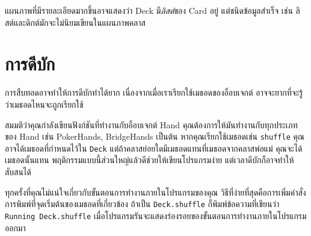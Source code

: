 แผนภาพที่มีรายละเอียดมากขึ้นอาจแสดงว่า Deck มี{\em ลิสต์}ของ Card อยู่ แต่ชนิดข้อมูลสำเร็จ 
เช่น ลิสต์และดิกต์มักจะไม่นิยมเขียนในแผนภาพคลาส

\section{การดีบัก}

การสืบทอดอาจทำให้การดีบักทำได้ยาก เนื่องจากเมื่อเราเรียกใช้เมธอดของอ็อบเจกต์ อาจจะยากที่จะรู้ว่าเมธอดไหนจะถูกเรียกใช้ 


สมมติว่าคุณกำลังเขียนฟังก์ชันที่ทำงานกับอ็อบเจกต์ Hand 
คุณต้องการให้มันทำงานกับทุกประเภทของ Hand 
เช่น PokerHands, BridgeHands เป็นต้น 
หากคุณเรียกใช้เมธอดเช่น {\tt shuffle} 
คุณอาจได้เมธอดที่กำหนดไว้ใน {\tt Deck} 
แต่ถ้าคลาสย่อยใดมีเมธอดแทนที่เมธอดจากคลาสพ่อแม่ คุณจะได้เมธอดนั้นแทน 
พฤติกรรมแบบนี้ส่วนใหญ่แล้วดีช่วยให้เขียนโปรแกรมง่าย แต่เวลาดีบักก็อาจทำให้สับสนได้



ทุกครั้งที่คุณไม่แน่ใจเกี่ยวกับขั้นตอนการทำงานภายในโปรแกรมของคุณ 
วิธีที่ง่ายที่สุดคือการเพิ่มคำสั่งการพิมพ์ที่จุดเริ่มต้นของเมธอดที่เกี่ยวข้อง 
ถ้าเป็น {\tt Deck.shuffle} ก็พิมพ์ข้อความที่เขียนว่า {\tt Running Deck.shuffle} เมื่อโปรแกรมรันจะแสดงร่องรอยของขั้นตอนการทำงานภายในโปรแกรมออกมา



